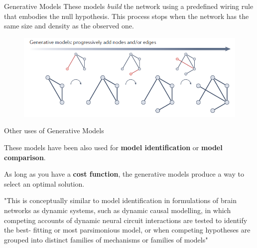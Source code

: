 \documentclass{beamer}
\begin{document}
	\begin{frame}{Generative Models}
		These models \textit{build} the network using a predefined wiring rule that embodies the null hypothesis. This process stops when the network has the same size and density as the observed one.
		\begin{figure}[h]
			\centering
				\includegraphics[scale=0.5]{../Figures/fig_null_models_2b.png}
		\end{figure}	
	\end{frame}
	
	\begin{frame}{Other uses of Generative Models}
		
		These models have been also used for \textbf{model identification} or \textbf{model comparison}.
		
		As long as you have a \textbf{cost function}, the generative models produce a way to select an optimal solution.
		
		"This is conceptually similar to
		model identification in formulations of brain networks
		as dynamic systems, such as dynamic causal modelling,
		in which competing accounts of dynamic neural circuit
		interactions are tested to identify the best- fitting or
		most parsimonious model, or when competing hypotheses
		are grouped into distinct families of mechanisms
		or families of models"
		
	\end{frame}
	
\end{document}
